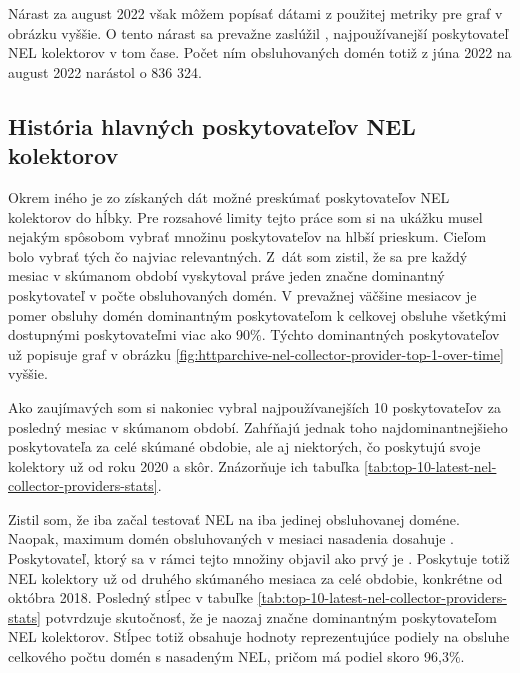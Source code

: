 \pagebreak

Nárast za august 2022 však môžem popísať dátami z použitej metriky pre graf v obrázku vyššie.
O tento nárast sa prevažne zaslúžil , najpoužívanejší poskytovateľ NEL kolektorov v tom čase. 
Počet ním obsluhovaných domén totiž z júna 2022 na august 2022 narástol o 836 324.

\subsection{História hlavných poskytovateľov NEL kolektorov}

Okrem iného je zo získaných dát možné preskúmať poskytovateľov NEL kolektorov do hĺbky.
Pre rozsahové limity tejto práce som si na ukážku musel nejakým spôsobom vybrať množinu poskytovateľov na hlbší prieskum.
Cieľom bolo vybrať tých čo najviac relevantných.
\mbox{Z dát} som zistil, že sa pre každý mesiac v skúmanom období vyskytoval práve jeden značne dominantný poskytovateľ v počte obsluhovaných domén.
V prevažnej väčšine mesiacov je pomer obsluhy domén dominantným poskytovateľom k celkovej obsluhe všetkými dostupnými poskytovateľmi viac ako 90\%.
Týchto dominantných poskytovateľov už popisuje graf v obrázku \ref{fig:httparchive-nel-collector-provider-top-1-over-time} vyššie.

Ako zaujímavých som si nakoniec vybral najpoužívanejších 10 poskytovateľov za posledný mesiac v skúmanom období.
Zahŕňajú jednak toho najdominantnejšieho poskytovateľa za celé skúmané obdobie, ale aj niektorých, čo poskytujú svoje kolektory už od roku 2020 a skôr.
Znázorňuje ich tabuľka \ref{tab:top-10-latest-nel-collector-providers-stats}.

Zistil som, že iba  začal testovať NEL na iba jedinej obsluhovanej doméne. Naopak, maximum domén obsluhovaných v mesiaci nasadenia dosahuje .
Poskytovateľ, ktorý sa v rámci tejto množiny objavil ako prvý je .
Poskytuje totiž NEL kolektory už od druhého skúmaného mesiaca za celé obdobie, konkrétne od októbra 2018.
Posledný stĺpec v tabuľke \ref{tab:top-10-latest-nel-collector-providers-stats} potvrdzuje skutočnosť, že  je naozaj značne dominantným poskytovateľom NEL kolektorov.
Stĺpec totiž obsahuje hodnoty reprezentujúce podiely na obsluhe celkového počtu domén s nasadeným NEL, pričom  má podiel skoro 96,3\%.

